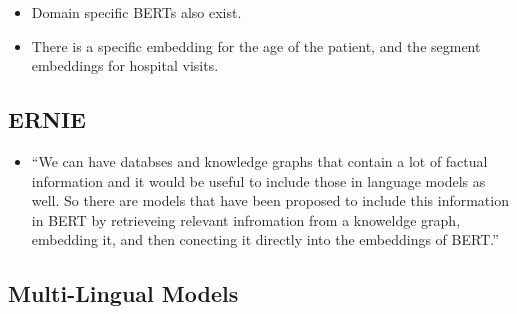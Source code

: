 \documentclass[11pt]{article}
\begin{document}
\begin{minipage}[l]{.5\linewidth}
    \begin{figure}[H]
        \centering
    \end{figure}    
\end{minipage}\hfill
\begin{minipage}[r]{.48\linewidth}
    \begin{itemize}
        \item Domain specific BERTs also exist. 
        \item There is a specific embedding for the age of the patient, and the segment embeddings for hospital visits.
    \end{itemize}
\end{minipage}

\subsection{ERNIE}

\begin{minipage}[l]{.5\linewidth}
    \begin{figure}[H]
        \centering
    \end{figure}    
\end{minipage}\hfill
\begin{minipage}[r]{.48\linewidth}
    \begin{itemize}
        \item ``We can have databses and knowledge graphs that contain a lot of factual information and it would be useful to include those in language models as well. So there are models that have been proposed to include this information in BERT by retrieveing relevant infromation from a knoweldge graph, embedding it, and then conecting it directly into the embeddings of BERT.''
    \end{itemize}
\end{minipage}

\subsection{Multi-Lingual Models}
\end{document}
